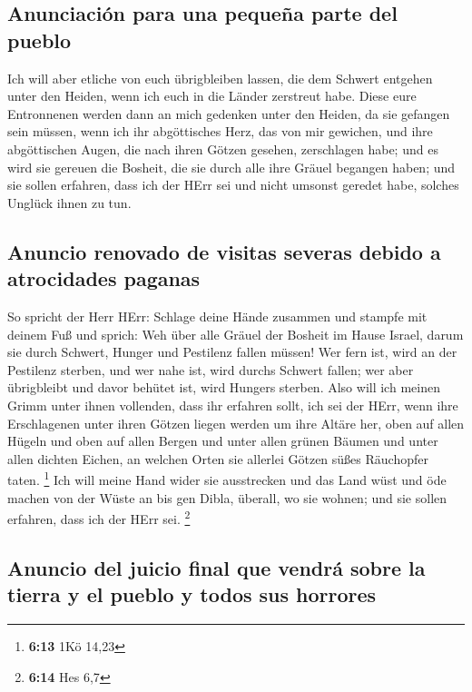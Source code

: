 \hypertarget{anunciaciuxf3n-para-una-pequeuxf1a-parte-del-pueblo}{%
\subsection{Anunciación para una pequeña parte del
pueblo}\label{anunciaciuxf3n-para-una-pequeuxf1a-parte-del-pueblo}}

 Ich will aber etliche von euch übrigbleiben lassen, die
dem Schwert entgehen unter den Heiden, wenn ich euch in die Länder
zerstreut habe.  Diese eure Entronnenen werden dann an
mich gedenken unter den Heiden, da sie gefangen sein müssen, wenn ich
ihr abgöttisches Herz, das von mir gewichen, und ihre abgöttischen
Augen, die nach ihren Götzen gesehen, zerschlagen habe; und es wird sie
gereuen die Bosheit, die sie durch alle ihre Gräuel begangen haben;
 und sie sollen erfahren, dass ich der HErr sei und nicht
umsonst geredet habe, solches Unglück ihnen zu tun.

\hypertarget{anuncio-renovado-de-visitas-severas-debido-a-atrocidades-paganas}{%
\subsection{Anuncio renovado de visitas severas debido a atrocidades
paganas}\label{anuncio-renovado-de-visitas-severas-debido-a-atrocidades-paganas}}

 So spricht der Herr HErr: Schlage deine Hände zusammen
und stampfe mit deinem Fuß und sprich: Weh über alle Gräuel der Bosheit
im Hause Israel, darum sie durch Schwert, Hunger und Pestilenz fallen
müssen!  Wer fern ist, wird an der Pestilenz sterben, und
wer nahe ist, wird durchs Schwert fallen; wer aber übrigbleibt und davor
behütet ist, wird Hungers sterben. Also will ich meinen Grimm unter
ihnen vollenden,  dass ihr erfahren sollt, ich sei der
HErr, wenn ihre Erschlagenen unter ihren Götzen liegen werden um ihre
Altäre her, oben auf allen Hügeln und oben auf allen Bergen und unter
allen grünen Bäumen und unter allen dichten Eichen, an welchen Orten sie
allerlei Götzen süßes Räuchopfer taten. \footnote{\textbf{6:13} 1Kö
  14,23}  Ich will meine Hand wider sie ausstrecken und
das Land wüst und öde machen von der Wüste an bis gen Dibla, überall, wo
sie wohnen; und sie sollen erfahren, dass ich der HErr sei. \footnote{\textbf{6:14}
  Hes 6,7}

\hypertarget{anuncio-del-juicio-final-que-vendruxe1-sobre-la-tierra-y-el-pueblo-y-todos-sus-horrores}{%
\subsection{Anuncio del juicio final que vendrá sobre la tierra y el
pueblo y todos sus
horrores}\label{anuncio-del-juicio-final-que-vendruxe1-sobre-la-tierra-y-el-pueblo-y-todos-sus-horrores}}


